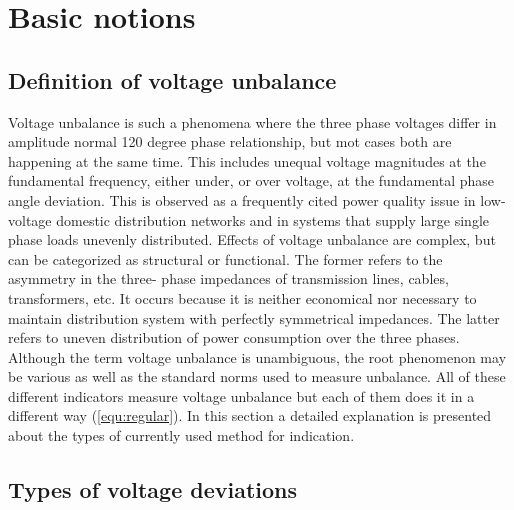 \chapter{Basic notions}

	\section{Definition of voltage unbalance}
	
	Voltage unbalance is such a phenomena where the three phase voltages differ in amplitude normal 120 degree phase relationship, but mot cases both are happening at the same time. This includes unequal voltage magnitudes at the fundamental frequency, either under, or over voltage, at the fundamental phase angle deviation. This is observed as a frequently cited power quality issue in low-voltage domestic distribution networks and in systems that supply large single phase loads unevenly distributed. Effects of voltage unbalance are complex, but can be categorized as structural or functional. The former refers to the asymmetry in the three- phase impedances of transmission lines, cables, transformers, etc. It occurs because it is neither economical nor necessary to maintain distribution system with perfectly symmetrical impedances. The latter refers to uneven distribution of power consumption over the three phases. Although the term voltage unbalance is unambiguous, the root phenomenon may be various as well as the standard norms used to measure unbalance. All of these different indicators measure voltage unbalance but each of them does it in a different way (\ref{equ:regular}). In this section a detailed explanation is presented about the types of currently used method for indication.
	
	\section{Types of voltage deviations}

